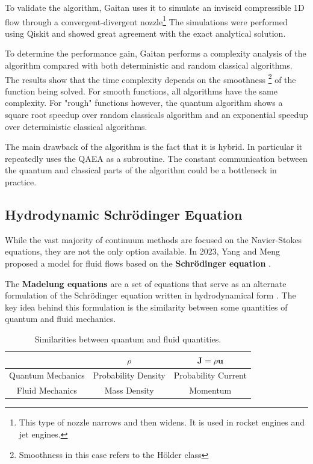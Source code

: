 \documentclass[conference]{IEEEtran}
\begin{document}
To validate the algorithm, Gaitan uses it to simulate an inviscid compressible 1D flow through a convergent-divergent nozzle\footnote{This type of nozzle narrows and then widens. It is used in rocket engines and jet engines.}
The simulations were performed using Qiskit \cite{qiskit2024} and showed great agreement with the exact analytical solution. 

To determine the performance gain, Gaitan performs a complexity analysis of the algorithm compared with both deterministic and random classical algorithms.
The results show that the time complexity depends on the smoothness \footnote{Smoothness in this case refers to the Hölder class} of the function being solved. For smooth functions, all algorithms have the same complexity.
For "rough" functions however, the quantum algorithm shows a square root speedup over random classicals algorithm and an exponential speedup over deterministic classical algorithms.

The main drawback of the algorithm is the fact that it is hybrid. In particular it repeatedly uses the QAEA as a subroutine. The constant communication between the quantum and classical parts of the algorithm could be a bottleneck in practice.

\subsection{Hydrodynamic Schrödinger Equation}
While the vast majority of continuum methods are focused on the Navier-Stokes equations, they are not the only option available.
In 2023, Yang and Meng proposed a model for fluid flows based on the \textbf{Schrödinger equation} \cite{meng2023quantum}.

The \textbf{Madelung equations} are a set of equations that serve as an alternate formulation of the Schrödinger equation written in hydrodynamical form \cite{schonberg1954hydrodynamical}.
The key idea behind this formulation is the similarity between some quantities of quantum and fluid mechanics.
\begin{table}[ht!]
    \caption{Similarities between quantum and fluid quantities.}
    \label{tab:quantities}
    \centering
    \begin{tabular}{|c|c|c|}
    \hline
    & $\rho$ & $\pmb{J}=\rho \pmb{u}$ \\
    \hline
    Quantum Mechanics & Probability Density & Probability Current \\
    \hline
    Fluid Mechanics & Mass Density & Momentum \\
    \hline
    \end{tabular}
\end{table}
\end{document}
